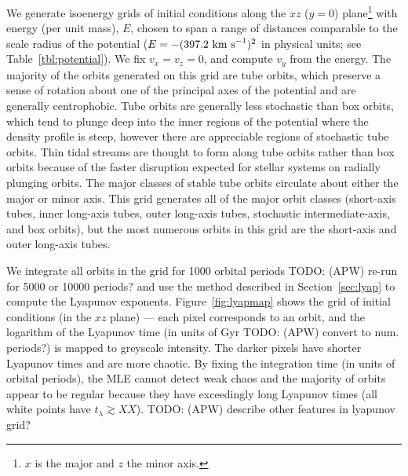 \documentclass[letterpaper,12pt,preprint]{aastex}
\newcommand{\todo}[2]{{\color{red} TODO: (\MakeUppercase{#1}) #2}}
\begin{document}
We generate isoenergy grids of initial conditions along the $xz$ ($y=0$) plane\footnote{$x$ is the major and $z$ the minor axis.} with energy (per unit mass), $E$, chosen to span a range of distances comparable to the scale radius of the potential ($E=-(397.2~{\rm km~s}^{-1})^2$ in physical units; see Table~\ref{tbl:potential}). We fix $v_x = v_z = 0$, and compute $v_y$ from the energy. The majority of the orbits generated on this grid are tube orbits, which preserve a sense of rotation about one of the principal axes of the potential and are generally centrophobic. Tube orbits are generally less stochastic than box orbits, which tend to plunge deep into the inner regions of the potential where the density profile is steep, however there are appreciable regions of stochastic tube orbits. Thin tidal streams are thought to form along tube orbits rather than box orbits because of the faster disruption expected for stellar systems on radially plunging orbits. The major classes of stable tube orbits circulate about either the major or minor axis. This grid generates all of the major orbit classes (short-axis tubes, inner long-axis tubes, outer long-axis tubes, stochastic intermediate-axis, and box orbits), but the most numerous orbits in this grid are the short-axis and outer long-axis tubes. 

We integrate all orbits in the grid for 1000 orbital periods \todo{apw}{re-run for 5000 or 10000 periods?} and use the method described in Section~\ref{sec:lyap} to compute the Lyapunov exponents. Figure~\ref{fig:lyapmap} shows the grid of initial conditions (in the $xz$ plane) --- each pixel corresponds to an orbit, and the logarithm of the Lyapunov time (in units of Gyr \todo{apw}{ convert to num. periods?}) is mapped to greyscale intensity. The darker pixels have shorter Lyapunov times and are more chaotic. By fixing the integration time (in units of orbital periods), the MLE cannot detect weak chaos and the majority of orbits appear to be regular because they have exceedingly long Lyapunov times (all white points have $t_\lambda \gtrsim XX$). \todo{apw}{describe other features in lyapunov grid?}
\end{document}
